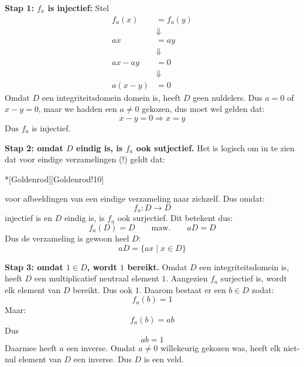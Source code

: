 \textbf{Stap 1: $f_a$ is injectief:} Stel
\begin{equation*}
    \begin{aligned}
        f_a(x) &= f_a(y) \\
        &\Downarrow \\
        ax &= ay \\
        &\Downarrow \\
        ax - ay &= 0 \\
        &\Downarrow \\
        a(x-y) &= 0
    \end{aligned}
\end{equation*}
Omdat $D$ een integriteitsdomein domein is, heeft $D$ geen nuldelers. Dus $a=0$ of $x-y=0$, maar we hadden een $a \neq 0$ gekozen, dus moet wel gelden dat:
\begin{equation*}
    x-y = 0 \Rightarrow x=y
\end{equation*}
Dus $f_a$ is injectief.

\textbf{Stap 2: omdat $D$ eindig is, is $f_a$ ook sutjectief.} Het is logisch om in te zien dat voor eindige verzamelingen (!) geldt dat:
\begin{equationbox}*[Goldenrod][Goldenrod!10]
     \iff {}
\end{equationbox}
voor afbeeldingen van een eindige verzameling naar zichzelf. Dus omdat:
\begin{equation*}
    f_a : D \to D
\end{equation*}
injectief is en $D$ eindig is, is $f_a$ ook surjectief. Dit betekent dus:
\begin{equation*}
    f_a(D) = D \qquad \text{maw.} \qquad aD = D
\end{equation*}
Dus de verzameling is gewoon heel $D$:
\begin{equation*}
    aD = \{ax \mid x \in D\}
\end{equation*}

\textbf{Stap 3: omdat $1\in D$, wordt $1$ bereikt.} Omdat $D$ een integriteitsdomein is, heeft $D$ een multiplicatief neutraal element $1$. Aangezien $f_a$ surjectief is, wordt elk element van $D$ bereikt. Dus ook $1$. Daarom bestaat er een $b\in D$ zodat:
\begin{equation*}
    f_a(b) = 1
\end{equation*}
Maar:
\begin{equation*}
    f_a(b) = ab
\end{equation*}
Dus
\begin{equation*}
    ab = 1
\end{equation*}
Daarmee heeft $a$ een inverse. Omdat $a\neq 0$ willekeurig gekozen was, heeft elk niet-nul element van $D$ een inverse. Dus $D$ is een veld.

